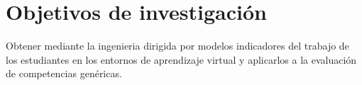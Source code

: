 
\section{Objetivos de investigación}
\label{sec:Objetivos}

Obtener mediante la ingenieria dirigida por modelos indicadores del trabajo de los estudiantes en los entornos de aprendizaje virtual y aplicarlos a la evaluación de competencias genéricas.